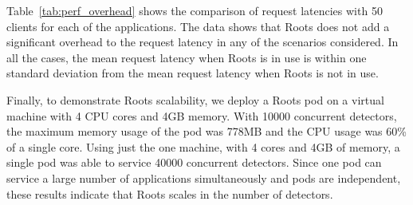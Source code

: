 Table~\ref{tab:perf_overhead} shows the comparison of request 
latencies with 50 clients for each of the applications. 
The data shows that Roots does not add a significant overhead
to the request latency in any of the scenarios considered. In all the cases,
the mean request latency when Roots is in use is within one standard deviation
from the mean request latency when Roots is not in use.



Finally, to demonstrate Roots scalability, we deploy
a Roots pod on a virtual machine with 4 CPU cores and 4GB memory.
%
%
%
With 10000 concurrent detectors, the maximum memory usage of the pod was 778MB and the CPU usage
was 60\% of a single core.  Using just the one machine, with 4 cores and 4GB of
memory, a single pod was able to service 40000 concurrent detectors. 
Since one pod can service a large number of applications simultaneously
 and pods are independent, these results indicate that Roots 
scales in the number of detectors.

%
